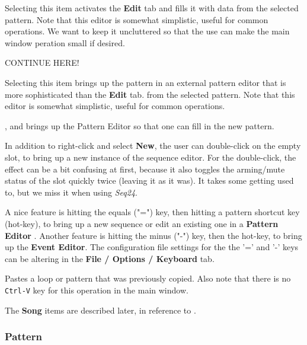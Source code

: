    \setcounter{ItemCounter}{0}      %

   Selecting this item activates the \textbf{Edit} tab and fills it with data
   from the selected pattern.
   Note that this editor is somewhat simplistic, useful for common operations.
   We want to keep it uncluttered so that the use can make the main window
   peration small if desired.

   CONTINUE HERE!


   Selecting this item brings up the pattern in an external pattern editor that
   is more sophisticated than the \textbf{Edit} tab.
   from the selected pattern.
   Note that this editor is somewhat simplistic, useful for common operations.

   , and brings up the Pattern Editor
   so that one can fill in the new pattern.

   In addition to right-click and select \textbf{New}, the user can
   double-click on the empty slot, to bring up a new instance of the sequence
   editor.  For the double-click, the effect can be a bit confusing at first,
   because it also toggles the arming/mute status of the slot
   quickly twice (leaving it as it was).  It takes some getting
   used to, but we miss it when using \textsl{Seq24}.

   A nice feature is hitting the equals ("=") key, then hitting
   a pattern shortcut key (hot-key), to bring up a new sequence or edit an
   existing one in a 
   \textbf{Pattern Editor} .  Another feature is hitting the minus
   ("-") key, then the hot-key, to bring up the \textbf{Event Editor}.
   The configuration file settings for the the '=' and
   '-' keys can be altering in the \textbf{File / Options / Keyboard} tab.

   Pastes a loop or pattern that was previously copied.
   Also note that there is no \texttt{Ctrl-V} key for this operation in the
   main window.

   The \textbf{Song} items are described later, in reference to
   .
   
\subsubsection{Pattern}
\label{subsubsec:patterns_pattern_filled}

